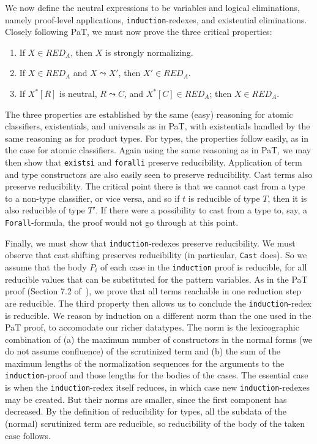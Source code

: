 \documentclass{fundam}
\begin{document}
We now define the neutral expressions to be variables and logical
eliminations, namely proof-level applications,
\texttt{induction}-redexes, and existential eliminations.  Closely
following PaT, we must now prove the three critical properties:

\begin{enumerate}
\item If $X\in\textit{RED}_A$, then $X$ is strongly normalizing.
\item If $X\in\textit{RED}_A$ and $X \leadsto X'$, then
$X'\in\textit{RED}_A$.
\item If $X^*[R]$ is neutral, $R \leadsto C$, and
$X^*[C]\in\textit{RED}_A$; then $X\in\textit{RED}_A$.
\end{enumerate}

\noindent The three properties are established by the same (easy)
reasoning for atomic classifiers, existentials, and universals as in
PaT, with existentials handled by the same reasoning as for product
types.  For types, the properties follow easily, as in the case for
atomic classifiers.  Again using the same reasoning as in PaT, we may
then show that \texttt{existsi} and \texttt{foralli} preserve
reducibility.  Application of term and type constructors are also
easily seen to preserve reducibility.  Cast terms also preserve
reducibility.  The critical point there is that we cannot cast from a
type to a non-type classifier, or vice versa, and so if $t$ is
reducible of type $T$, then it is also reducible of type $T'$.  If
there were a possibility to cast from a type to, say, a
\texttt{Forall}-formula, the proof would not go through at this point.

Finally, we must show that \texttt{induction}-redexes preserve
reducibility.  We must observe that cast shifting preserves
reducibility (in particular, \texttt{Cast} does).  So we assume that
the body $P_i$ of each case in the \texttt{induction} proof is
reducible, for all reducible values that can be substituted for the
pattern variables.  As in the PaT proof (Section 7.2 of~\cite{pat}),
we prove that all terms reachable in one reduction step are reducible.
The third property then allows us to conclude the
\texttt{induction}-redex is reducible.  We reason by induction on a
different norm than the one used in the PaT proof, to accomodate our
richer datatypes.  The norm is the lexicographic combination of (a)
the maximum number of constructors in the normal forms (we do not
assume confluence) of the scrutinized term and (b) the sum of the
maximum lengths of the normalization sequences for the arguments to
the \texttt{induction}-proof and those lengths for the bodies of the
cases.  The essential case is when the \texttt{induction}-redex itself
reduces, in which case new \texttt{induction}-redexes may be created.
But their norms are smaller, since the first component has decreased.
By the definition of reducibility for types, all the subdata of the
(normal) scrutinized term are reducible, so reducibility of the body
of the taken case follows.
\end{document}
